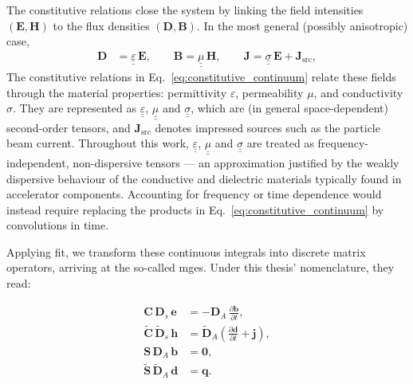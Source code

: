 The constitutive relations close the system by linking the field intensities $(\mathbf{E},\mathbf{H})$ to the flux densities $(\mathbf{D},\mathbf{B})$. In the most general (possibly anisotropic) case,
\begin{align}
\mathbf{D} &= \underline{\underline{\varepsilon}}\,\mathbf{E}, \qquad
\mathbf{B} = \underline{\underline{\mu}}\,\mathbf{H}, \qquad
\mathbf{J} = \underline{\underline{\sigma}}\,\mathbf{E} + \mathbf{J}_{\mathrm{src}},
\label{eq:constitutive_continuum}
\end{align}
%
The constitutive relations in Eq.~\eqref{eq:constitutive_continuum} relate these fields through the material properties: permittivity $\varepsilon$, permeability $\mu$, and conductivity $\sigma$. They are represented as $\underline{\underline{\varepsilon}}$, $\underline{\underline{\mu}}$ and $\underline{\underline{\sigma}}$, which are (in general space-dependent) second-order tensors, and $\mathbf{J}_{\mathrm{src}}$ denotes impressed sources such as the particle beam current. Throughout this work, $\underline{\underline{\varepsilon}}$, $\underline{\underline{\mu}}$ and $\underline{\underline{\sigma}}$ are treated as frequency-independent, non-dispersive tensors --- an approximation justified by the weakly dispersive behaviour of the conductive and dielectric materials typically found in accelerator components. Accounting for frequency or time dependence would instead require replacing the products in Eq.~\eqref{eq:constitutive_continuum} by convolutions in time.

Applying \gls{fit}, we transform these continuous integrals into discrete matrix operators, arriving at the so-called \glspl{mge}. Under this thesis' nomenclature, they read:

\begin{align}
\mathbf{C}\,\mathbf{D}_s\,\mathbf{e}
&= -\mathbf{D}_A\,\frac{\partial \mathbf{b}}{\partial t},
\label{eq:MGE:faraday}\\
\widetilde{\mathbf{C}}\,\widetilde{\mathbf{D}}_s\,\mathbf{h}
&= \widetilde{\mathbf{D}}_A
\left(\frac{\partial \mathbf{d}}{\partial t}+\mathbf{j}\right),
\label{eq:MGE:ampere}\\
\mathbf{S}\,\mathbf{D}_A\,\mathbf{b}
&= \mathbf{0},
\label{eq:MGE:gauss_mag}\\
\widetilde{\mathbf{S}}\,\widetilde{\mathbf{D}}_A\,\mathbf{d}
&= \mathbf{q}.
\label{eq:MGE:gauss_el}
\end{align}

